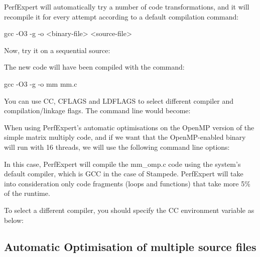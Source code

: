 PerfExpert will automatically try a number of code transformations, and it will recompile it for every attempt according to a default compilation command:

\begin{prompt}
gcc -O3 -g -o <binary-file> <source-file>
\end{prompt}

Now, try it on a sequential source:

\begin{prompt}
\end{prompt}

The new code will have been compiled with the command:
\begin{prompt}
gcc -O3 -g -o mm mm.c
\end{prompt}

You can use CC, CFLAGS and LDFLAGS to select different compiler and compilation/linkage flags. The command line would become:
\begin{prompt}
\end{prompt}

When using PerfExpert's automatic optimisations on the OpenMP version of the simple matrix multiply code, and if we want that the OpenMP-enabled binary will run with 16 threads, we will use the following command line options:
\begin{prompt}
\end{prompt}

In this case, PerfExpert will compile the mm\_omp.c code using the system's default compiler, which is GCC in the case of Stampede. PerfExpert will take into consideration only code fragments (loops and functions) that take more 5\% of the runtime.

To select a different compiler, you should specify the CC environment variable as below:
\begin{prompt}
\end{prompt}

\subsection{Automatic Optimisation of multiple source files}
\label{subsec:Automatic_Optimization_multiple}

